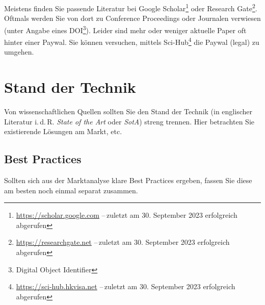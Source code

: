 Meistens finden Sie passende Literatur bei Google Scholar\footnote{\url{https://scholar.google.com} --\,zuletzt am 30. September 2023 erfolgreich abgerufen} oder Research Gate\footnote{\url{https://researchgate.net} --\,zuletzt am 30. September 2023 erfolgreich abgerufen}. Oftmals werden Sie von dort zu Conference Proceedings oder Journalen verwiesen (unter Angabe eines DOI\footnote{Digital Object Identifier}). Leider sind mehr oder weniger aktuelle Paper oft hinter einer Paywal. Sie können versuchen, mittels Sci-Hub\footnote{\url{https://sci-hub.hkvisa.net} --\,zuletzt am 30. September 2023 erfolgreich abgerufen} die Paywal (legal) zu umgehen.

\section{Stand der Technik}\label{sec:RelatedWork:SotA}
Von wissenschaftlichen Quellen sollten Sie den Stand der Technik (in englischer Literatur i.\,d.\,R. \emph{State of the Art} oder \emph{SotA}) streng trennen. Hier betrachten Sie existierende Lösungen am Markt, etc.

\subsection{Best Practices}\label{subsec:RelatedWork:BestPractices}
Sollten sich aus der Marktanalyse klare Best Practices ergeben, fassen Sie diese am besten noch einmal separat zusammen.